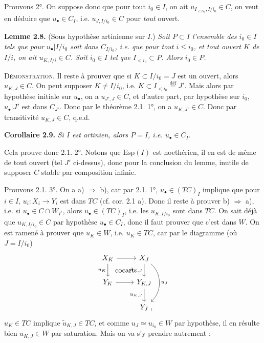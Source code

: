 \documentclass[11pt]{article}
\newcommand{\printedpage}[1]{\marginpar{\footnotesize p.~#1}}
\newcommand{\msp}[1]{\marginpar{\footnotesize [#1]}}
\begin{document}
\msp{35}

Prouvons 2°. On suppose donc que pour tout $i_0 \in I$, on ait $u_{I_{<\alpha_0},I/i_0} \in C$, on veut en déduire que $u_\bullet \in C_I$, i.e. $u_{J,I/i_0} \in C$ pour \textit{tout} ouvert.

\noindent\textbf{Lemme 2.8.} (Sous hypothèse artinienne sur $I$.) \textit{Soit $P \subset I$ l'ensemble des $i_0 \in I$ tels que pour $u_\bullet|I/i_0$ soit dans $C_{I/i_0}$, i.e. que pour tout $i \leq i_0$, et tout ouvert $K$ de $I/i$, on ait $u_{K,I/i} \in C$. Soit $i_0 \in I$ tel que $I_{<i_0} \subset P$. Alors $i_0 \in P$.}

\noindent\textsc{Démonstration}. Il reste à prouver que si $K \subset I/i_0 = J$ est un ouvert, alors $u_{K,J} \in C$. On peut supposer $K \neq I/i_0$, i.e. $K \subset I_{<i_0} \overset{\text{déf}}{=} J'$. Mais alors par hypothèse initiale sur $u_\bullet$, on a $u_{J',J} \in C$, et d'autre part, par hypothèse sur $i_0$, $u_\bullet|J'$ est dans $C_{J'}$. Donc par le théorème 2.1. 1°, on a $u_{K,J'} \in C$. Donc par transitivité $u_{K,J} \in C$, q.e.d.

\noindent\textbf{Corollaire 2.9.} \textit{Si $I$ est artinien, alors $P = I$, i.e. $u_\bullet \in C_I$.}

Cela prouve donc 2.1. 2°. Notons que $\mathrm{Esp}(I)$ est noethérien, il en est de même de tout ouvert (tel $J'$ ci-dessus), donc \msp{36} pour la conclusion du lemme, inutile de supposer $C$ stable par composition infinie.

\printedpage{20}

Prouvons 2.1. 3°. On a a) $\Longrightarrow$ b), car par 2.1. 1°, $u_\bullet \in (TC)_I$ implique que pour $i \in I$, $u_i : X_i \longrightarrow Y_i$ est dans $TC$ (cf. cor. 2.1 a). Donc il reste à prouver b) $\Longrightarrow$ a), i.e. si $u_\bullet \in C \cap W_{I^\circ}$, alors $u_\bullet \in (TC)_I$, i.e. les $u_{K,I/i_0}$ sont dans $TC$. On sait déjà que $u_{K,I/i_0} \in C$ par hypothèse $u_\bullet \in C_I$, donc il faut prouver que c'est dans $W$. On est ramené à prouver que $u_K \in W$, i.e. $u_K \in TC$, car par le diagramme (où $J = I/i_0$)
\[
\begin{tikzcd}
X_K \arrow[r] \arrow[d, "u_K"'] \arrow[dr, phantom, "\text{cocart.}"] & X_J \arrow[d, "\tilde{u}_{K,J}"'] \arrow[dd, bend left=50, "u_J"] \\
Y_K \arrow[r] & Y_{K,J} \arrow[d, "u_{K,J}"'] \\
& Y_J \rlap{\ ,}
\end{tikzcd}
\]
$u_K \in TC$ implique $\tilde{u}_{K,J} \in TC$, et comme $u_J \simeq u_{i_0} \in W$ par hypothèse, il en résulte bien $u_{K,J} \in W$ par saturation. Mais on va s'y prendre autrement :
\end{document}
